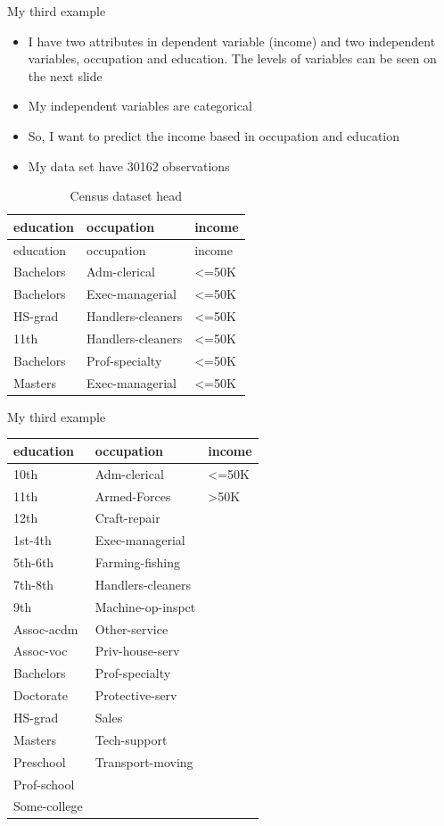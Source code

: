 \documentclass[
  10pt,
  ignorenonframetext,
]{beamer}
\providecommand{\tightlist}{%
  \setlength{\itemsep}{0pt}\setlength{\parskip}{0pt}}
\begin{document}
\begin{frame}{My third example}
\protect\hypertarget{my-third-example}{}

\begin{itemize}
\tightlist
\item
  I have two attributes in dependent variable (income) and two
  independent variables, occupation and education. The levels of
  variables can be seen on the next slide
\item
  My independent variables are categorical
\item
  So, I want to predict the income based in occupation and education
\item
  My data set have 30162 observations
\end{itemize}

\begin{longtable}[]{@{}lll@{}}
\caption{Census dataset head}\tabularnewline
\toprule
education & occupation & income\tabularnewline
\midrule
\endfirsthead
\toprule
education & occupation & income\tabularnewline
\midrule
\endhead
Bachelors & Adm-clerical & \textless=50K\tabularnewline
Bachelors & Exec-managerial & \textless=50K\tabularnewline
HS-grad & Handlers-cleaners & \textless=50K\tabularnewline
11th & Handlers-cleaners & \textless=50K\tabularnewline
Bachelors & Prof-specialty & \textless=50K\tabularnewline
Masters & Exec-managerial & \textless=50K\tabularnewline
\bottomrule
\end{longtable}

\end{frame}

\begin{frame}{My third example}
\protect\hypertarget{my-third-example-1}{}

\begin{longtable}[]{@{}lll@{}}
\toprule
education & occupation & income\tabularnewline
\midrule
\endhead
10th & Adm-clerical & \textless=50K\tabularnewline
11th & Armed-Forces & \textgreater50K\tabularnewline
12th & Craft-repair &\tabularnewline
1st-4th & Exec-managerial &\tabularnewline
5th-6th & Farming-fishing &\tabularnewline
7th-8th & Handlers-cleaners &\tabularnewline
9th & Machine-op-inspct &\tabularnewline
Assoc-acdm & Other-service &\tabularnewline
Assoc-voc & Priv-house-serv &\tabularnewline
Bachelors & Prof-specialty &\tabularnewline
Doctorate & Protective-serv &\tabularnewline
HS-grad & Sales &\tabularnewline
Masters & Tech-support &\tabularnewline
Preschool & Transport-moving &\tabularnewline
Prof-school & &\tabularnewline
Some-college & &\tabularnewline
\bottomrule
\end{longtable}

\end{frame}
\end{document}
